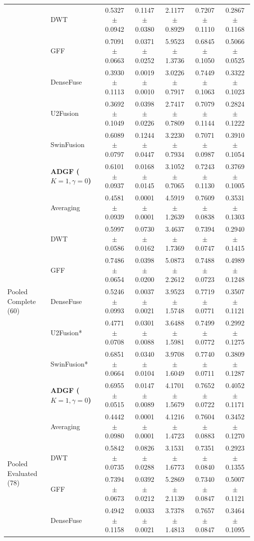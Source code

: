 \documentclass[conference]{IEEEtran}
\begin{document}
\begin{table}[htbp]
\begin{tabular}{llccccc}
& DWT & 0.5327$\pm$0.0942 & 0.1147$\pm$0.0380 & 2.1177$\pm$0.8929 & 0.7207$\pm$0.1110 & 0.2867$\pm$0.1168 \\
& GFF & 0.7091$\pm$0.0663 & 0.0371$\pm$0.0252 & 5.9523$\pm$1.3736 & 0.6845$\pm$0.1050 & 0.5066$\pm$0.0525 \\
& DenseFuse & 0.3930$\pm$0.1113 & 0.0019$\pm$0.0010 & 3.0226$\pm$0.7917 & 0.7449$\pm$0.1063 & 0.3322$\pm$0.1023 \\
& U2Fusion & 0.3692$\pm$0.1049 & 0.0398$\pm$0.0226 & 2.7417$\pm$0.7809 & 0.7079$\pm$0.1144 & 0.2824$\pm$0.1222 \\
& SwinFusion & 0.6089$\pm$0.0797 & 0.1244$\pm$0.0447 & 3.2230$\pm$0.7934 & 0.7071$\pm$0.0987 & 0.3910$\pm$0.1054 \\
& \textbf{ADGF ($K=1,\gamma=0$)} & 0.6101$\pm$0.0937 & 0.0168$\pm$0.0145 & 3.1052$\pm$0.7065 & 0.7243$\pm$0.1130 & 0.3769$\pm$0.1005 \\
\midrule
\multirow{7}{*}{Pooled Complete (60)}
& Averaging & 0.4581$\pm$0.0939 & 0.0001$\pm$0.0001 & 4.5919$\pm$1.2639 & 0.7609$\pm$0.0838 & 0.3531$\pm$0.1303 \\
& DWT & 0.5997$\pm$0.0586 & 0.0730$\pm$0.0162 & 3.4637$\pm$1.7369 & 0.7394$\pm$0.0747 & 0.2940$\pm$0.1415 \\
& GFF & 0.7486$\pm$0.0654 & 0.0398$\pm$0.0200 & 5.0873$\pm$2.2612 & 0.7488$\pm$0.0723 & 0.4989$\pm$0.1248 \\
& DenseFuse & 0.5246$\pm$0.0993 & 0.0037$\pm$0.0021 & 3.9523$\pm$1.5748 & 0.7719$\pm$0.0771 & 0.3507$\pm$0.1121 \\
& U2Fusion* & 0.4771$\pm$0.0708 & 0.0301$\pm$0.0088 & 3.6488$\pm$1.5981 & 0.7499$\pm$0.0772 & 0.2992$\pm$0.1275 \\
& SwinFusion* & 0.6851$\pm$0.0664 & 0.0340$\pm$0.0104 & 3.9708$\pm$1.6049 & 0.7740$\pm$0.0711 & 0.3809$\pm$0.1287 \\
& \textbf{ADGF ($K=1,\gamma=0$)} & 0.6955$\pm$0.0515 & 0.0147$\pm$0.0089 & 4.1701$\pm$1.5679 & 0.7652$\pm$0.0722 & 0.4052$\pm$0.1171 \\
\midrule
\multirow{7}{*}{Pooled Evaluated (78)}
& Averaging & 0.4442$\pm$0.0980 & 0.0001$\pm$0.0001 & 4.1216$\pm$1.4723 & 0.7604$\pm$0.0883 & 0.3452$\pm$0.1270 \\
& DWT & 0.5842$\pm$0.0735 & 0.0826$\pm$0.0288 & 3.1531$\pm$1.6773 & 0.7351$\pm$0.0840 & 0.2923$\pm$0.1355 \\
& GFF & 0.7394$\pm$0.0673 & 0.0392$\pm$0.0212 & 5.2869$\pm$2.1139 & 0.7340$\pm$0.0847 & 0.5007$\pm$0.1121 \\
& DenseFuse & 0.4942$\pm$0.1158 & 0.0033$\pm$0.0021 & 3.7378$\pm$1.4813 & 0.7657$\pm$0.0847 & 0.3464$\pm$0.1095 \\

\end{tabular}
\end{table}
\end{document}
